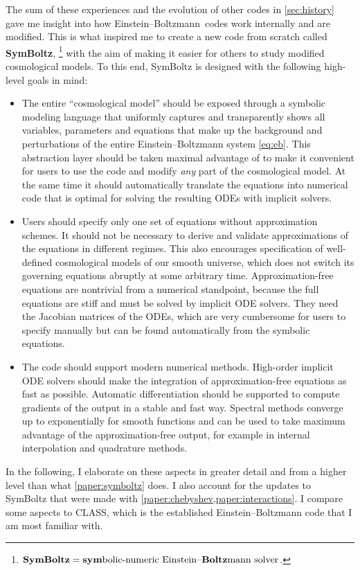 \documentclass[USenglish, thumbmarks]{uiophdthesis} %
\newcommand\EB{Einstein--Boltzmann}
\begin{document}
The sum of these experiences and the evolution of other codes in \cref{sec:history}
gave me insight into how \EB{} codes work internally and are modified.
This is what inspired me to create a new code from scratch called \textbf{SymBoltz},%
\footnote{$\textbf{SymBoltz} = \text{\textbf{sym}bolic-numeric Einstein--\textbf{Boltz}mann solver}$.}
with the aim of making it easier for others to study modified cosmological models.
To this end, SymBoltz is designed with the following high-level goals in mind:
\begin{itemize}
\item
The entire \enquote{cosmological model} should be exposed through a symbolic modeling language
that uniformly captures and transparently shows all variables, parameters and equations
that make up the background and perturbations of the entire \EB{} system \eqref{eq:eb}.
This abstraction layer should be taken maximal advantage of to make it convenient for users
to use the code and modify \emph{any} part of the cosmological model.
At the same time it should automatically translate the equations into numerical code
that is optimal for solving the resulting ODEs with implicit solvers.
\item
Users should specify only one set of equations without approximation schemes.
It should not be necessary to derive and validate approximations of the equations in different regimes.
This also encourages specification of well-defined cosmological models of our smooth universe,
which does not switch its governing equations abruptly at some arbitrary time.
Approximation-free equations are nontrivial from a numerical standpoint,
because the full equations are stiff and must be solved by implicit ODE solvers.
They need the Jacobian matrices of the ODEs,
which are very cumbersome for users to specify manually
but can be found automatically from the symbolic equations.
\item
The code should support modern numerical methods.
High-order implicit ODE solvers should make the integration of approximation-free equations as fast as possible.
Automatic differentiation should be supported to compute gradients of the output in a stable and fast way.
Spectral methods converge up to exponentially for smooth functions
and can be used to take maximum advantage of the approximation-free output,
for example in internal interpolation and quadrature methods.
\end{itemize}
In the following, I elaborate on these aspects in greater detail
and from a higher level than what \cref{paper:symboltz} does.
I also account for the updates to SymBoltz that were made with \cref{paper:chebyshev,paper:interactions}.
I compare some aspects to CLASS, which is the established \EB{} code that I am most familiar with.
\end{document}
